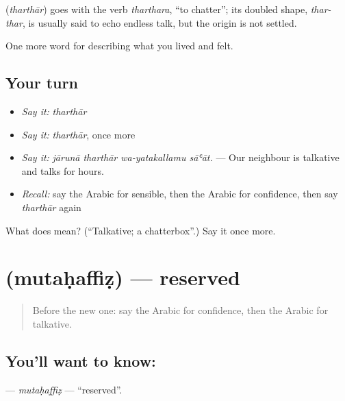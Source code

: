\begin{cousinweb}
\textbf{} (\emph{tharthār}) goes with the verb \emph{tharthara}, \textquotedblleft{}to chatter\textquotedblright{}; its doubled shape, \emph{thar-thar}, is usually said to echo endless talk, but the origin is not settled.
\end{cousinweb}

\begin{grammarlens}[title={What you've built}]
One more word for describing what you lived and felt.
\end{grammarlens}

\subsection*{Your turn}
\begin{itemize}
\raggedright
  \item \emph{Say it:} \emph{tharthār}
  \item \emph{Say it:} \emph{tharthār}, once more
  \item \emph{Say it:} \emph{jārunā tharthār wa-yatakallamu sāʿāt.} — Our neighbour is talkative and talks for hours.
  \item \emph{Recall:} say the Arabic for sensible, then the Arabic for confidence, then say \emph{tharthār} again
\end{itemize}

\begin{tcolorbox}[breakable,colback=teal!4,colframe=teal!35!black,title={Before you move on}]
What does  mean? (\textquotedblleft{}Talkative; a chatterbox\textquotedblright{}.) Say it once more.
\end{tcolorbox}
\section[\texorpdfstring{\ar{متحفظ} (mutaḥaffiẓ)}{متحفظ (mutaḥaffiẓ)}]{ (mutaḥaffiẓ) — reserved}

\label{lesson:AR-C502-mutahaffiz}



\begin{quote}
Before the new one: say the Arabic for confidence, then the Arabic for talkative.
\end{quote}

\subsection*{You'll want to know: }
\textbf{} — \emph{mutaḥaffiẓ} — \textquotedblleft{}reserved\textquotedblright{}.

